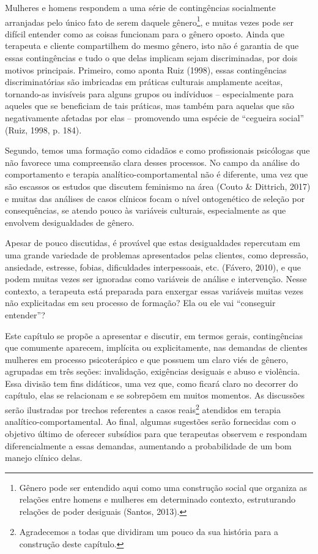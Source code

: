 Mulheres e homens respondem a uma série de contingências socialmente arranjadas pelo único fato de serem daquele gênero\footnote{Gênero pode ser entendido aqui como uma construção social que organiza as relações entre homens e mulheres em determinado contexto, estruturando relações de poder desiguais (Santos, 2013).}, e muitas vezes pode ser difícil entender como as coisas funcionam para o gênero oposto. Ainda que terapeuta e cliente compartilhem do mesmo gênero, isto não é garantia de que essas contingências e tudo o que delas implicam sejam discriminadas, por dois motivos principais. Primeiro, como aponta Ruiz (1998), essas contingências discriminatórias são imbricadas em práticas culturais amplamente aceitas, tornando-as invisíveis para alguns grupos ou indíviduos – especialmente para aqueles que se beneficiam de tais práticas, mas também para aquelas que são negativamente afetadas por elas – promovendo uma espécie de ``cegueira social'' (Ruiz, 1998, p. 184).

Segundo, temos uma formação como cidadãos e como profissionais psicólogas que não favorece uma compreensão clara desses processos. No campo da análise do comportamento e terapia analítico-comportamental não é diferente, uma vez que são escassos os estudos que discutem feminismo na área (Couto \& Dittrich, 2017) e muitas das análises de casos clínicos focam o nível ontogenético de seleção por consequências, se atendo pouco às variáveis culturais, especialmente as que envolvem desigualdades de gênero.

Apesar de pouco discutidas, é provável que estas desigualdades repercutam em uma grande variedade de problemas apresentados pelas clientes, como depressão, ansiedade, estresse, fobias, dificuldades interpessoais, etc. (Fávero, 2010), e que podem muitas vezes ser ignoradas como variáveis de análise e intervenção. Nesse contexto, a terapeuta está preparada para enxergar essas variáveis muitas vezes não explicitadas em seu processo de formação? Ela ou ele vai ``conseguir entender''?

Este capítulo se propõe a apresentar e discutir, em termos gerais, contingências que comumente aparecem, implícita ou explicitamente, nas demandas de clientes mulheres em processo psicoterápico e que possuem um claro viés de gênero, agrupadas em três seções: invalidação, exigências desiguais e abuso e violência. Essa divisão tem fins didáticos, uma vez que, como ficará claro no decorrer do capítulo, elas se relacionam e se sobrepõem em muitos momentos. As discussões serão ilustradas por trechos referentes a casos reais\footnote{Agradecemos a todas que dividiram um pouco da sua história para a construção deste capítulo.} atendidos em terapia analítico-comportamental. Ao final, algumas sugestões serão fornecidas com o objetivo último de oferecer subsídios para que terapeutas observem e respondam diferencialmente a essas demandas, aumentando a probabilidade de um bom manejo clínico delas. 

